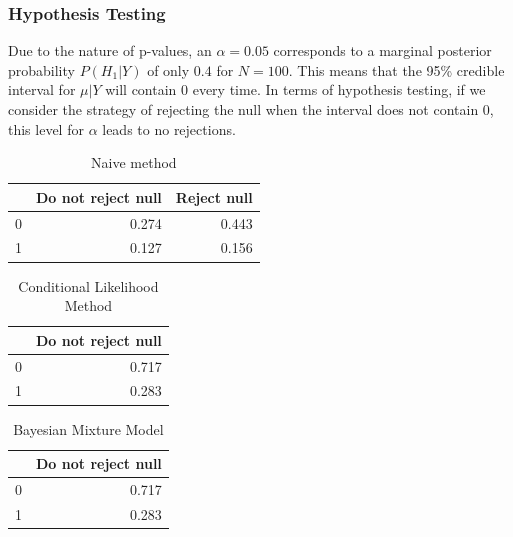 \documentclass[AMA,STIX1COL]{WileyNJD-v2}\usepackage[]{graphicx}\usepackage[]{color}
\newenvironment{knitrout}{}{} %
\begin{document}
\subsubsection{Hypothesis Testing}


Due to the nature of p-values, an $\alpha = 0.05$ corresponds to a marginal posterior probability $P(H_1 | Y )$ of only $0.4$ for $N = 100$. This means that the 95\% credible interval for $\mu| Y$ will contain 0 every time. In terms of hypothesis testing, if we consider the strategy of rejecting the null when the interval does not contain 0, this level for $\alpha$ leads to no rejections.

\begin{knitrout}
\color{fgcolor}\begin{table}

\caption{\label{tab:unnamed-chunk-13}Naive method}
\centering
\begin{tabular}[t]{l|r|r}
\hline
  & Do not reject null & Reject null\\
\hline
0 & 0.274 & 0.443\\
\hline
1 & 0.127 & 0.156\\
\hline
\end{tabular}
\end{table}


\end{knitrout}

\begin{knitrout}
\color{fgcolor}\begin{table}

\caption{\label{tab:unnamed-chunk-14}Conditional Likelihood Method}
\centering
\begin{tabular}[t]{l|r}
\hline
  & Do not reject null\\
\hline
0 & 0.717\\
\hline
1 & 0.283\\
\hline
\end{tabular}
\end{table}


\end{knitrout}

\begin{knitrout}
\color{fgcolor}\begin{table}

\caption{\label{tab:unnamed-chunk-15}Bayesian Mixture Model}
\centering
\begin{tabular}[t]{l|r}
\hline
  & Do not reject null\\
\hline
0 & 0.717\\
\hline
1 & 0.283\\
\hline
\end{tabular}
\end{table}


\end{knitrout}
\end{document}

